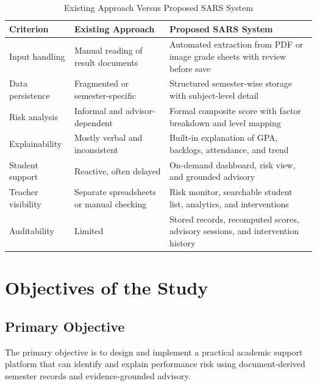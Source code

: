 \begin{table}[H]
\centering
\caption{Existing Approach Versus Proposed SARS System}
\begin{tabularx}{\textwidth}{>{\raggedright\arraybackslash}p{} >{\raggedright\arraybackslash}X >{\raggedright\arraybackslash}X}
\toprule
\textbf{Criterion} & \textbf{Existing Approach} & \textbf{Proposed SARS System} \\
\midrule
Input handling & Manual reading of result documents & Automated extraction from PDF or image grade sheets with review before save \\
Data persistence & Fragmented or semester-specific & Structured semester-wise storage with subject-level detail \\
Risk analysis & Informal and advisor-dependent & Formal composite score with factor breakdown and level mapping \\
Explainability & Mostly verbal and inconsistent & Built-in explanation of GPA, backlogs, attendance, and trend \\
Student support & Reactive, often delayed & On-demand dashboard, risk view, and grounded advisory \\
Teacher visibility & Separate spreadsheets or manual checking & Risk monitor, searchable student list, analytics, and interventions \\
Auditability & Limited & Stored records, recomputed scores, advisory sessions, and intervention history \\
\bottomrule
\end{tabularx}
\end{table}

\section{Objectives of the Study}
\subsection{Primary Objective}
The primary objective is to design and implement a practical academic support platform that can identify and explain performance risk using document-derived semester records and evidence-grounded advisory.

